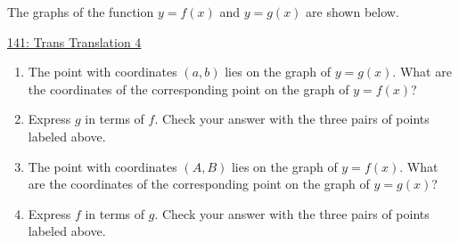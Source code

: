 \documentclass{ximera}
\begin{document}
\begin{question} \label{QK3f3fefe33f}
The graphs of the function $y=f(x)$ and $y=g(x)$ are shown below.

\begin{onlineOnly}
    \begin{center}
\end{center}
\end{onlineOnly}

\href{https://www.desmos.com/calculator/qhts1sps06}{141: Trans Translation 4}

\begin{enumerate}
\item The point with coordinates $(a,b)$ lies on the graph of $y=g(x)$. What are the coordinates of the corresponding point on the graph of $y=f(x)$?

\item Express $g$ in terms of $f$. Check your answer with the three pairs of points labeled above. 

\item The point with coordinates $(A,B)$ lies on the graph of $y=f(x)$. What are the coordinates of the corresponding point on the graph of $y=g(x)$?

\item Express $f$ in terms of $g$. Check your answer with the three pairs of points labeled above.
\end{enumerate}

\end{question}
\end{document}
